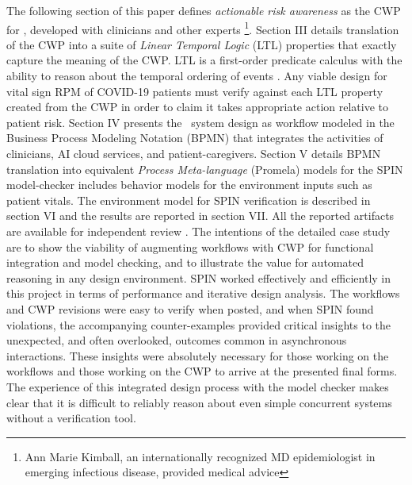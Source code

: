 The following section of this paper defines \emph{actionable risk awareness} as the CWP for \phware, developed with clinicians and other experts \footnote{Ann Marie Kimball, an internationally recognized MD epidemiologist in emerging infectious disease, provided medical advice}.
Section III details translation of the CWP into a suite of \emph{Linear Temporal Logic} (LTL) properties that exactly capture the meaning of the CWP.
LTL is a first-order predicate calculus with the ability to reason about the temporal ordering of events \cite{10.5555/975331}.
Any viable design for vital sign RPM of COVID-19 patients must verify against each LTL property created from the CWP in order to claim it takes appropriate action relative to patient risk.
Section IV presents the \phware\ system design as workflow modeled in the Business Process Modeling Notation (BPMN) \cite{BPMN} that integrates the activities of clinicians, AI cloud services, and patient-caregivers.
Section V details BPMN translation into equivalent \emph{Process Meta-language} (Promela) models for the SPIN model-checker \cite{spin} includes behavior models for the environment inputs such as patient vitals. 
The environment model for SPIN verification is described in section VI and the results are reported in section VII.
All the reported artifacts are available for independent review \cite{repo}.
The intentions of the detailed case study are to show the viability of augmenting workflows with CWP for functional integration and model checking, and to illustrate the value for automated reasoning in any design environment.
SPIN worked effectively and efficiently in this project in terms of performance and iterative design analysis.
The workflows and CWP revisions were easy to verify when posted, and when SPIN found violations, the accompanying counter-examples provided critical insights to the unexpected, and often overlooked, outcomes common in asynchronous interactions.
These insights were absolutely necessary for those working on the workflows and those working on the CWP to arrive at the presented final forms.
The experience of this integrated design process with the model checker makes clear that it is difficult to reliably reason about even simple concurrent systems without a verification tool.